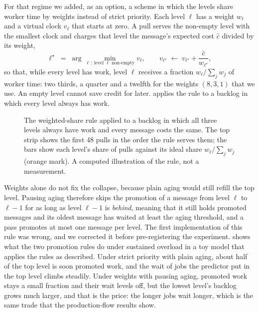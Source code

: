 For that regime we added, as an option, a scheme in which the levels share worker time by weights instead of strict priority. Each level $\ell$ has a weight $w_\ell$ and a virtual clock $v_\ell$ that starts at zero. A pull serves the non-empty level with the smallest clock and
charges that level the message's expected cost $\hat{c}$ divided by its weight,
\begin{equation}
  \ell^{\star} \;=\; \arg\min_{\ell\,:\,\text{level }\ell\text{ non-empty}} v_\ell,
  \qquad
  v_{\ell^{\star}} \;\leftarrow\; v_{\ell^{\star}} + \frac{\hat{c}}{w_{\ell^{\star}}},
  \label{eq:clock}
\end{equation}
so that, while every level has work, level $\ell$ receives a fraction $w_\ell/\sum_{j} w_j$ of worker time: two thirds, a quarter and a twelfth for the weights $(8,3,1)$ that we use. An empty level cannot save credit for later.  applies the rule to
a backlog in which every level always has work.

\begin{figure}[t]
  \centering
  
  \caption{The weighted-share rule applied to a backlog in which all three levels always have work and every message costs the same. The
  top strip shows the first 48 pulls in the order the rule serves them; the bars show each level's share of pulls against its ideal share $w_\ell/\sum_j w_j$ (orange mark).
  A computed illustration of the rule, not a measurement.}
  \label{fig:weights}
\end{figure}

Weights alone do not fix the collapse, because plain aging would still refill the top level. Pausing aging therefore skips the promotion of a message from level $\ell$ to $\ell-1$ for as long as level $\ell-1$ is \emph{behind}, meaning that it still holds promoted messages and its
oldest message has waited at least the aging threshold, and a pass promotes at most one message per level. The first implementation of this rule was wrong, and we corrected it before pre-registering the experiment.  shows what the two promotion rules do under sustained overload in a toy model that
applies the rules as described. Under strict priority with plain aging, about half of the top level is soon promoted work, and the wait of jobs the predictor put in the top level climbs steadily. Under weights with pausing aging, promoted work stays a small fraction and their wait levels off, but the lowest
level's backlog grows much larger, and that is the price: the longer jobs wait longer, which is the same trade that the production-flow results show.

